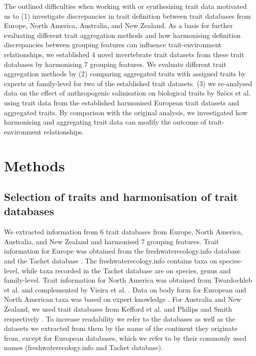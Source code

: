 \documentclass{article}
\begin{document}
The outlined difficulties when working with or synthesizing trait data motivated us to (1) investigate discrepancies in trait definition between trait databases from Europe, North America, Australia, and New Zealand. As a basis for further evaluating different trait aggregation methods and how harmonising definition discrepancies between grouping features can influence trait-environment relationships, we established 4 novel invertebrate trait datasets from these trait databases by harmonising 7 grouping features. We evaluate different trait aggregation methods by (2) comparing aggregated traits with assigned traits by experts at family-level for two of the established trait datasets. (3) we re-analysed data on the effect of anthropogenic salinisation on biological traits by Szöcs et al. \cite{szocs_effects_2014} using trait data from the established harmonised European trait datasets and aggregated traits. By comparison with the original analysis, we investigated how harmonising and aggregating trait data can modify the outcome of trait-environment relationships.

\newpage

\section*{Methods}

\subsection*{Selection of traits and harmonisation of trait databases}

We extracted information from 6 trait databases from Europe, North America, Australia, and New Zealand and harmonised 7 grouping features. Trait information for Europe was obtained from the freshwaterecology.info database \cite{schmidt-kloiber_www.freshwaterecology.info_2015} and the Tachet database \cite{usseglio-polatera_biomonitoring_2000}. The freshwaterecology.info contains taxa on species-level, while taxa recorded in the Tachet database are on species, genus and family-level. Trait information for North America was obtained from Twardochleb et al. \cite{twardochleb_trait_data_2020} and complemented by Vieira et al. \cite{vieira_database_nodate}. Data on body form for European and North American taxa was based on expert knowledge \cite{polatera_personal_information_2020}. For Australia and New Zealand, we used trait databases from Kefford et al. \cite{kefford_integrated_2020} and Philips and Smith respectively \cite{Philips_and_Smith_NZ_DB_2018}. To increase readability we refer to the databases as well as the datasets we extracted from them by the name of the continent they originate from, except for European databases, which we refer to by their commonly used names (freshwaterecology.info and Tachet database). 
 
\end{document}
